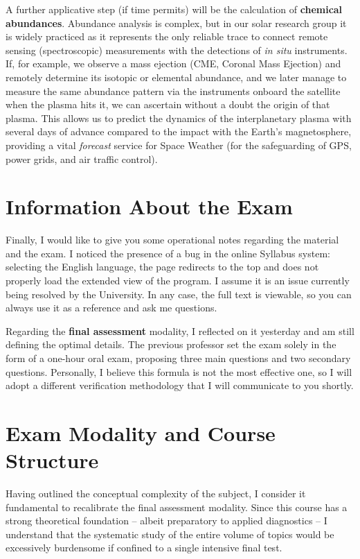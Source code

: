    A further applicative step (if time permits) will be the calculation of \textbf{chemical abundances}. Abundance analysis is complex, but in our solar research group it is widely practiced as it represents the only reliable trace to connect remote sensing (spectroscopic) measurements with the detections of \textit{in situ} instruments.
    If, for example, we observe a mass ejection (CME, Coronal Mass Ejection) and remotely determine its isotopic or elemental abundance, and we later manage to measure the same abundance pattern via the instruments onboard the satellite when the plasma hits it, we can ascertain without a doubt the origin of that plasma. This allows us to predict the dynamics of the interplanetary plasma with several days of advance compared to the impact with the Earth's magnetosphere, providing a vital \textit{forecast} service for Space Weather (for the safeguarding of GPS, power grids, and air traffic control).
    
\section{Information About the Exam}

Finally, I would like to give you some operational notes regarding the material and the exam.
I noticed the presence of a bug in the online Syllabus system: selecting the English language, the page redirects to the top and does not properly load the extended view of the program. I assume it is an issue currently being resolved by the University. In any case, the full text is viewable, so you can always use it as a reference and ask me questions.

Regarding the \textbf{final assessment} modality, I reflected on it yesterday and am still defining the optimal details. The previous professor set the exam solely in the form of a one-hour oral exam, proposing three main questions and two secondary questions. Personally, I believe this formula is not the most effective one, so I will adopt a different verification methodology that I will communicate to you shortly.

\section{Exam Modality and Course Structure}

Having outlined the conceptual complexity of the subject, I consider it fundamental to recalibrate the final assessment modality. Since this course has a strong theoretical foundation – albeit preparatory to applied diagnostics – I understand that the systematic study of the entire volume of topics would be excessively burdensome if confined to a single intensive final test.

